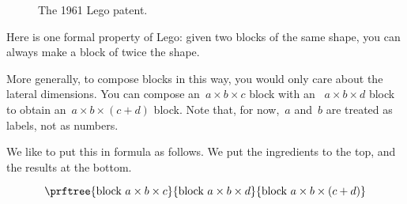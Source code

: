 \begin{comment}
\devel{
  \begin{tikzpicture}
    \brick{4}{2}{cred}{0}{0}{0}{1}
  \end{tikzpicture}
  \hfill

  \begin{tikzpicture}
    \brickcustom{4}{2}{pink}{4}{2}{0}{1}
    \brickcustom{4}{2}{blue}{4}{0}{0}{1}
    \brickcustom{4}{2}{green}{0}{2}{0}{1}
    \brickcustom{4}{2}{cred}{0}{0}{0}{0.33}
    \brickcustom{4}{2}{cwhite}{0}{0}{1}{0.33} %
    \brickcustom{4}{2}{cred}{0}{0}{2}{0.33} %
    \brickcustom{2}{4}{cwhite}{6}{0}{1}{1}

  \end{tikzpicture}
}
\end{comment}

\begin{figure*}[p]
  \centering
%
  \caption{The 1961 Lego patent.}
\end{figure*}
Here is one formal property of Lego: given two blocks of the same shape, you can always make a block of twice the shape.

More generally, to compose blocks in this way, you would only care about the lateral dimensions.
You can compose an~$a \times b \times c$ block with an ~$a \times b \times d$ block to obtain an~$a \times b \times( c + d)$ block.
Note that, for now,~$a$ and~$b$ are treated as labels, not as numbers.

We like to put this in formula as follows. We put the ingredients to the top, and the results at the bottom.

\begin{equation}
  \prftree{\text{block } a \times b \times c}{\text{block } a \times b \times d }{%
    \text{block } a \times b \times (c+d)
  }
\end{equation}

